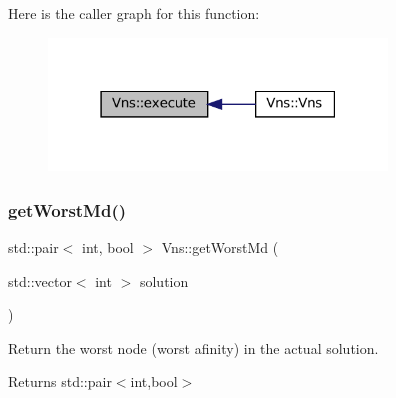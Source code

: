 Here is the caller graph for this function\+:
\nopagebreak
\begin{figure}[H]
\begin{center}
\leavevmode
\includegraphics[width=255pt]{classVns_aece2ea2cb74dd3608570321fcbb2de0c_icgraph}
\end{center}
\end{figure}
\mbox{\label{classVns_a2349cd809a0925058a35dea1722c7c23}} 
\subsubsection{\texorpdfstring{get\+Worst\+Md()}{getWorstMd()}}
{\footnotesize\ttfamily std\+::pair$<$ int, bool $>$ Vns\+::get\+Worst\+Md (\begin{DoxyParamCaption}\item[{std\+::vector$<$ int $>$}]{solution }\end{DoxyParamCaption})}



Return the worst node (worst afinity) in the actual solution. 

\begin{DoxyReturn}{Returns}
std\+::pair$<$int,bool$>$ 
\end{DoxyReturn}

